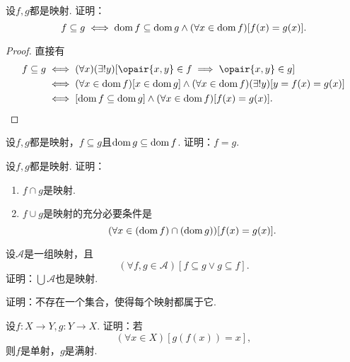 \begin{example}
设\(f,g\)都是映射.
证明：\[
	f \subseteq g
	\iff
	\operatorname{dom} f \subseteq \operatorname{dom} g
	\land
	(\forall x \in \operatorname{dom} f)
	[f(x) = g(x)].
\]
\begin{proof}
直接有
\begin{align*}
	f \subseteq g
	&\iff (\forall x)(\exists!y)[\opair{x,y} \in f \implies \opair{x,y} \in g] \\
	&\iff (\forall x \in \dom f)[x \in \dom g]\land(\forall x \in \dom f)(\exists!y)[y=f(x)=g(x)] \\
	&\iff [\dom f \subseteq \dom g]\land(\forall x \in \dom f)[f(x)=g(x)].
	\qedhere
\end{align*}
\end{proof}
\end{example}

\begin{example}
设\(f,g\)都是映射，\(f \subseteq g\)且\(\operatorname{dom} g \subseteq \operatorname{dom} f\).
证明：\(f=g\).
\end{example}

\begin{example}
设\(f,g\)都是映射.
证明：
\begin{enumerate}
	\item \(f \cap g\)是映射.
	\item \(f \cup g\)是映射的充分必要条件是\[
		(\forall x \in (\operatorname{dom} f)\cap(\operatorname{dom} g))[f(x)=g(x)].
	\]
\end{enumerate}
\end{example}

\begin{example}
\def\A{\mathscr{A}}%
设\(\A\)是一组映射，且\[
	(\forall f,g\in\A)[f \subseteq g \lor g \subseteq f].
\]
证明：\(\bigcup\A\)也是映射.
\end{example}

\begin{example}
证明：不存在一个集合，使得每个映射都属于它.
\end{example}

\begin{example}
设\(f\colon X \to Y,
g\colon Y \to X\).
证明：若\[
	(\forall x \in X)[g(f(x)) = x],
\]
则\(f\)是单射，\(g\)是满射.
\end{example}

